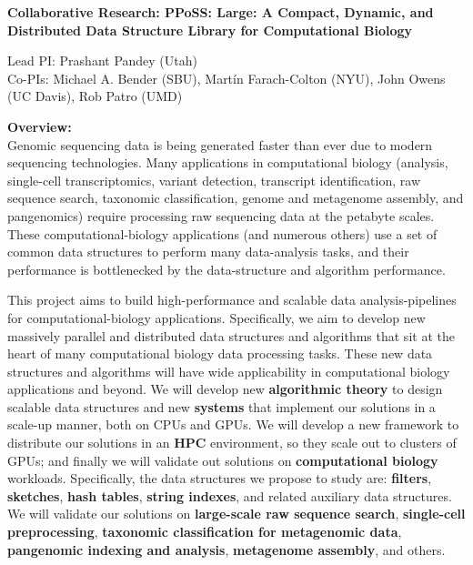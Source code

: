 
\begin{center}
\bf
\Large
Collaborative Research: PPoSS\@: Large: A Compact, Dynamic, and Distributed Data
Structure Library for Computational Biology

\medskip
\small
Lead PI: Prashant Pandey (Utah)\\
Co-PIs: Michael A. Bender (SBU), Mart\'{i}n Farach-Colton (NYU), John Owens (UC Davis), Rob Patro (UMD)
\end{center}

\noindent \textbf{\large Overview:}\\
Genomic sequencing data is being generated faster than ever due to modern sequencing technologies.
Many applications in computational biology (\kmer analysis, single-cell transcriptomics, variant detection, transcript identification, raw sequence search, taxonomic classification, genome and metagenome assembly, and pangenomics) require processing raw sequencing data at the petabyte scales.
%
These computational-biology applications (and numerous others) use a set of common data structures to perform many data-analysis tasks, and their performance is bottlenecked by the data-structure and algorithm performance.

This project aims to build high-performance and scalable data analysis-pipelines for computational-biology applications. Specifically, we aim to develop new massively parallel and distributed data structures and algorithms that sit at the heart of many computational biology data processing tasks. These new data structures and algorithms will have wide applicability in computational biology applications and beyond.
%
We will develop new \textbf{algorithmic theory} to design scalable data structures and new \textbf{systems} that implement our solutions in a scale-up manner, both on CPUs and GPUs. We will develop a new framework to distribute our solutions in an \textbf{HPC} environment, so they scale out to clusters of GPUs; and finally we will validate out solutions on \textbf{computational biology} workloads.
%
Specifically, the data structures we propose to study are: \textbf{filters}, \textbf{sketches}, \textbf{hash tables}, \textbf{string indexes}, and related auxiliary data structures.  We will validate our solutions on \textbf{large-scale raw sequence search}, \textbf{single-cell preprocessing}, \textbf{taxonomic classification for metagenomic data}, \textbf{pangenomic indexing and analysis}, \textbf{metagenome assembly}, and others.

